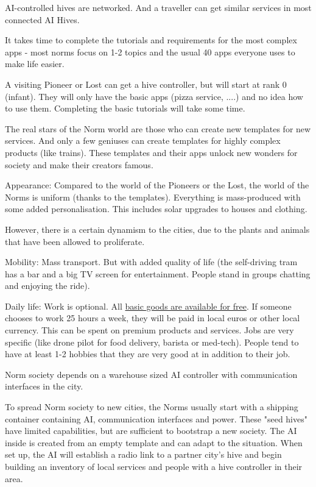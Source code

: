 AI-controlled hives are networked. And a traveller can get similar services in most connected AI Hives.

It takes time to complete the tutorials and requirements for the most complex apps - most norms focus on 1-2 topics and the usual 40 apps everyone uses to make life easier.

A visiting Pioneer or Lost can get a hive controller, but will start at rank 0 (infant). They will only have the basic apps (pizza service, ....) and no idea how to use them. Completing the basic tutorials will take some time.

The real stars of the Norm world are those who can create new templates for new services. And only a few geniuses can create templates for highly complex products (like trains).
These templates and their apps unlock new wonders for society and make their creators famous.

Appearance: Compared to the world of the Pioneers or the Lost, the world of the Norms is uniform (thanks to the templates). Everything is mass-produced with some added personalisation. This includes solar upgrades to houses and clothing.

However, there is a certain dynamism to the cities, due to the plants and animals that have been allowed to proliferate.

Mobility: Mass transport. But with added quality of life (the self-driving tram has a bar and a big TV screen for entertainment. People stand in groups chatting and enjoying the ride).

Daily life: Work is optional. All \hyperref[sec:basic income]{basic goods are available for free}. If someone chooses to work 25 hours a week, they will be paid in local euros or other local currency. This can be spent on premium products and services. Jobs are very specific (like drone pilot for food delivery, barista or med-tech). People tend to have at least 1-2 hobbies that they are very good at in addition to their job.

Norm society depends on a warehouse sized AI controller with communication interfaces in the city.

To spread Norm society to new cities, the Norms usually start with a shipping container containing AI, communication interfaces and power. These "seed hives" have limited capabilities, but are sufficient to bootstrap a new society. The AI inside is created from an empty template and can adapt to the situation. When set up, the AI will establish a radio link to a partner city's hive and begin building an inventory of local services and people with a hive controller in their area.

